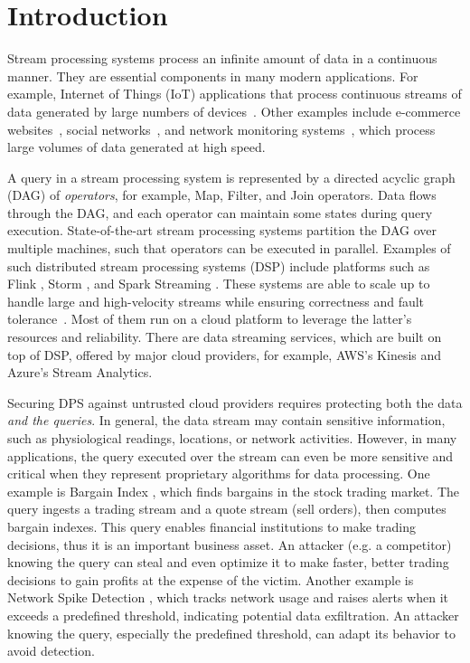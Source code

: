 \section{Introduction}
\label{sec:intro}
Stream processing systems process an infinite amount of data in a continuous manner.  They are essential components in
many modern applications. For example, Internet of Things (IoT) applications that process continuous streams of data
generated by large numbers of devices~\cite{sasaki2021survey}. Other examples include e-commerce websites~\cite{tucker2008nexmark}, social
networks~\cite{noghabi2017samza, toshniwal2014storm}, and network monitoring systems~\cite{bhatia2021mstream}, which process large volumes of data generated at high
speed.

A query in a stream processing system is represented by a directed acyclic graph (DAG) of {\em operators}, for example, Map, Filter, and Join operators. Data flows through the DAG, and each operator can maintain some states during query
execution. State-of-the-art stream processing systems partition the DAG over multiple machines, such that operators can
be executed in parallel. Examples of such distributed stream processing systems (DSP) include platforms such as Flink \cite{carbone2015apache},
Storm \cite{toshniwal2014storm}, and Spark Streaming \cite{zaharia2013discretized}. These systems are able to scale up to handle large and high-velocity streams while ensuring correctness and fault tolerance~\cite{lin2016streamscope}. Most of them run on a cloud platform to leverage the latter's resources and
reliability. There are data streaming services, which are built on top of DSP, offered by major cloud
providers, for example, AWS's Kinesis and Azure's Stream Analytics.

Securing DPS against untrusted cloud providers requires protecting both the data {\em and the queries}. In general, the data stream may contain sensitive information, such as physiological readings, locations, or network activities. 
%
However, in many applications, the query executed over the stream can even be more sensitive and critical when they represent proprietary algorithms for data processing. One example is Bargain Index \cite{spade}, which finds bargains in the stock trading market. The query ingests a trading stream and a quote stream (sell orders), then computes bargain indexes. This query enables financial institutions to make trading decisions, thus it is an important business asset. An attacker (e.g. a competitor) knowing the query can steal and even optimize it to make faster, better trading decisions to gain profits at the expense of the victim. Another example is Network Spike Detection \cite{SAQL}, which tracks network usage and raises alerts when it exceeds a predefined threshold, indicating potential data exfiltration. An attacker knowing the query, especially the predefined threshold, can adapt its behavior to avoid detection. 

